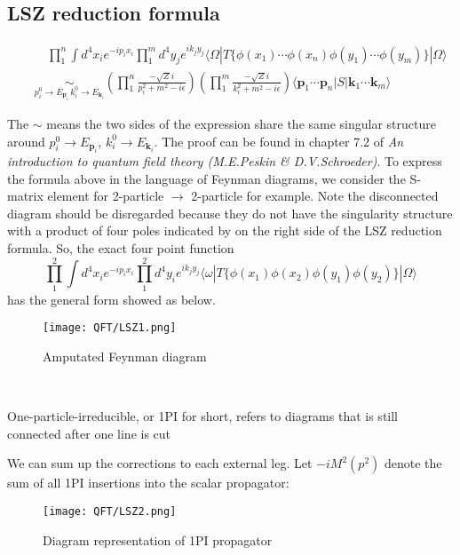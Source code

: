 \subsection{LSZ reduction formula}
\begin{newthem}
\begin{eqnarray}
&& \quad \prod_1^n \int d^4 x_i e^{-ip_ix_i} \prod_1^m d^4 y_j e^{ik_jy_j} \langle \Omega | T \{\phi(x_1) \cdots \phi(x_n) \phi(y_1) \cdots \phi(y_m)\} | \Omega \rangle \nonumber \\
&& \underset{ p_i^0 \to E_{\bm{p}_i}\, k_i^0 \to E_{\bm{k}_i}}{\sim}  \left( \prod_1^n \frac{-\sqrt{Z} i}{p_i^2 + m^2 -i\epsilon} \right) \left( \prod_1^m \frac{-\sqrt{Z} i}{k_i^2 + m^2 -i\epsilon} \right) \langle \bm{p}_1 \cdots \bm{p}_n | S | \bm{k}_1 \cdots \bm{k}_m \rangle \nonumber
\end{eqnarray}
\end{newthem}
\noindent
The $\sim$ means the two sides of the expression share the same singular structure around $p_i^0 \to E_{\bm{p}_i}$, $k_i^0 \to E_{\bm{k}_i}$.
The proof can be found in chapter 7.2 of \emph{An introduction to quantum field theory (M.E.Peskin \& D.V.Schroeder)}.
To express the formula above in the language of Feynman diagrams, we consider the S-matrix element for 2-particle $\to$ 2-particle for example. Note the disconnected diagram should be disregarded because they do not have the singularity structure with a product of four poles indicated by on the right side of the LSZ reduction formula. So, the exact four point function
\[\prod_1^2 \int d^4 x_i e^{-ip_ix_i} \prod_1^2 d^4 y_i e^{ik_jy_j} \langle \omega | T \{\phi(x_1)\phi(x_2)\phi(y_1) \phi(y_2)\} | \Omega \rangle \]
has the general form showed as below.
\begin{figure}[!h]
\centering
\texttt{[image: QFT/LSZ1.png]}
\caption{Amputated Feynman diagram}
\end{figure}\\
\begin{note}
One-particle-irreducible, or 1PI for short, refers to diagrams that is still connected after one line is cut
\end{note}
\noindent
We can sum up the corrections to each external leg. Let $-iM^2(p^2)$ denote the sum of all 1PI insertions into the scalar propagator:
\begin{figure}[!h]
\centering
\texttt{[image: QFT/LSZ2.png]}
\caption{Diagram representation of 1PI propagator}
\end{figure}\\
